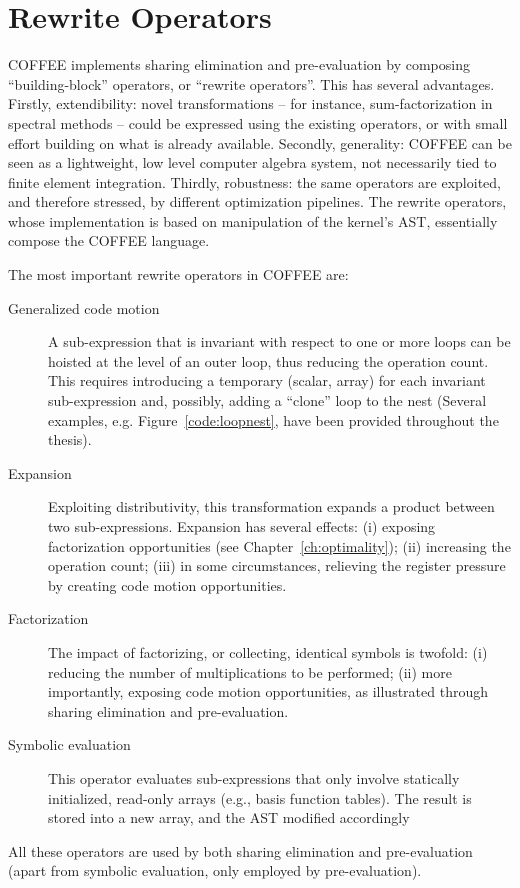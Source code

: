 \section{Rewrite Operators}
\label{sec:coffee:rewrite-ops}
COFFEE implements sharing elimination and pre-evaluation by composing ``building-block'' operators, or ``rewrite operators''. This has several advantages. Firstly, extendibility: novel transformations -- for instance, sum-factorization in spectral methods -- could be expressed using the existing operators, or with small effort building on what is already available. Secondly, generality: COFFEE can be seen as a lightweight, low level computer algebra system, not necessarily tied to finite element integration. Thirdly, robustness: the same operators are exploited, and therefore stressed, by different optimization pipelines. The rewrite operators, whose implementation is based on manipulation of the kernel's AST, essentially compose the COFFEE language. 

The most important rewrite operators in COFFEE are:
\begin{description}
\item[Generalized code motion] A sub-expression that is invariant with respect to one or more loops can be hoisted at the level of an outer loop, thus reducing the operation count. This requires introducing a temporary (scalar, array) for each invariant sub-expression and, possibly, adding a ``clone'' loop to the nest (Several examples, e.g. Figure~\ref{code:loopnest}, have been provided throughout the thesis). 
\item[Expansion] Exploiting distributivity, this transformation expands a product between two sub-expressions. Expansion has several effects: (i) exposing factorization opportunities (see Chapter~\ref{ch:optimality}); (ii) increasing the operation count; (iii) in some circumstances, relieving the register pressure by creating code motion opportunities.
\item[Factorization] The impact of factorizing, or collecting, identical symbols is twofold: (i) reducing the number of multiplications to be performed; (ii) more importantly, exposing code motion opportunities, as illustrated through sharing elimination and pre-evaluation.
\item[Symbolic evaluation] This operator evaluates sub-expressions that only involve statically initialized, read-only arrays (e.g., basis function tables). The result is stored into a new array, and the AST modified accordingly
\end{description}
All these operators are used by both sharing elimination and pre-evaluation (apart from symbolic evaluation, only employed by pre-evaluation).

